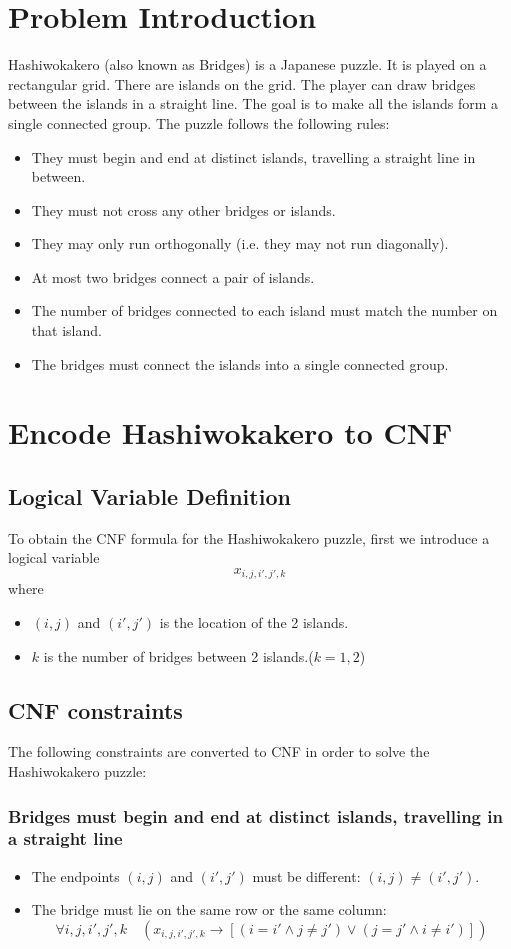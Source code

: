 \documentclass[12pt, a4paper]{article}
\begin{document}
\section{Problem Introduction}
Hashiwokakero (also known as Bridges) is a Japanese puzzle. It is played on a rectangular grid. There are islands on the grid. The player can draw bridges between the islands in a straight line. The goal is to make all the islands form a single connected group. The puzzle follows the following rules:
\begin{itemize}
    \item They must begin and end at distinct islands, travelling a straight line in between.
    \item They must not cross any other bridges or islands.
    \item They may only run orthogonally (i.e. they may not run diagonally).
    \item At most two bridges connect a pair of islands.
    \item The number of bridges connected to each island must match the number on that island.
    \item The bridges must connect the islands into a single connected group.
\end{itemize}
\section{Encode Hashiwokakero to CNF}
\subsection{Logical Variable Definition}
To obtain the CNF formula for the Hashiwokakero puzzle, first we introduce a logical variable \\
\[ x_{i,j,i',j',k} \]
where 
\begin{itemize}
  \item $(i,j)$ and $(i',j')$ is the location of the 2 islands.
  \item $k$ is the number of bridges between 2 islands.($k=1,2$)
\end{itemize}
\subsection{CNF constraints}
The following constraints are converted to CNF in order to solve the Hashiwokakero puzzle:
\subsubsection{Bridges must begin and end at distinct islands, travelling in a straight line}
\begin{itemize}
    \item The endpoints $(i,j)$ and $(i',j')$ must be different: $(i,j) \ne (i',j')$.
    \item The bridge must lie on the same row or the same column:
    \[
    \forall i, j, i', j', k \quad \left( x_{i,j,i',j',k} \rightarrow \left[ (i = i' \land j \ne j') \lor (j = j' \land i \ne i') \right] \right)
    \]
    
\end{itemize}
\end{document}
